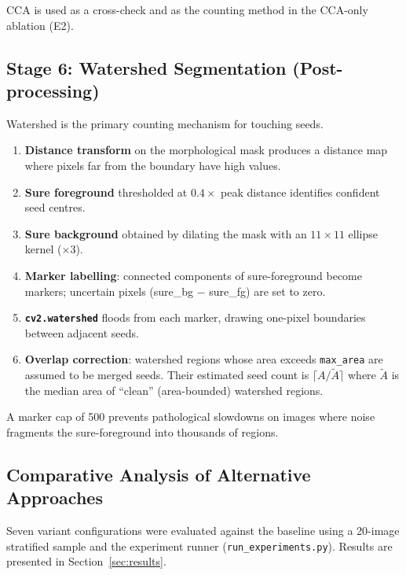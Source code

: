 \documentclass[12pt,a4paper]{article}
\begin{document}
CCA is used as a cross-check and as the counting method in the CCA-only
ablation (E2).

\subsection{Stage 6: Watershed Segmentation (Post-processing)}

Watershed is the primary counting mechanism for touching seeds.

\begin{enumerate}
    \item \textbf{Distance transform} on the morphological mask produces a
          distance map where pixels far from the boundary have high values.
    \item \textbf{Sure foreground} thresholded at $0.4 \times$ peak distance
          identifies confident seed centres.
    \item \textbf{Sure background} obtained by dilating the mask with an
          $11 \times 11$ ellipse kernel ($\times 3$).
    \item \textbf{Marker labelling}: connected components of sure-foreground
          become markers; uncertain pixels (sure\_bg $-$ sure\_fg) are set to
          zero.
    \item \textbf{\texttt{cv2.watershed}} floods from each marker, drawing
          one-pixel boundaries between adjacent seeds.
    \item \textbf{Overlap correction}: watershed regions whose area exceeds
          \texttt{max\_area} are assumed to be merged seeds. Their estimated
          seed count is $\lceil A / \tilde{A} \rceil$ where $\tilde{A}$ is the
          median area of ``clean'' (area-bounded) watershed regions.
\end{enumerate}

A marker cap of 500 prevents pathological slowdowns on images where noise
fragments the sure-foreground into thousands of regions.

\subsection{Comparative Analysis of Alternative Approaches}

Seven variant configurations were evaluated against the baseline using a
20-image stratified sample and the experiment runner
(\texttt{run\_experiments.py}). Results are presented in Section~\ref{sec:results}.

\newpage
\end{document}
